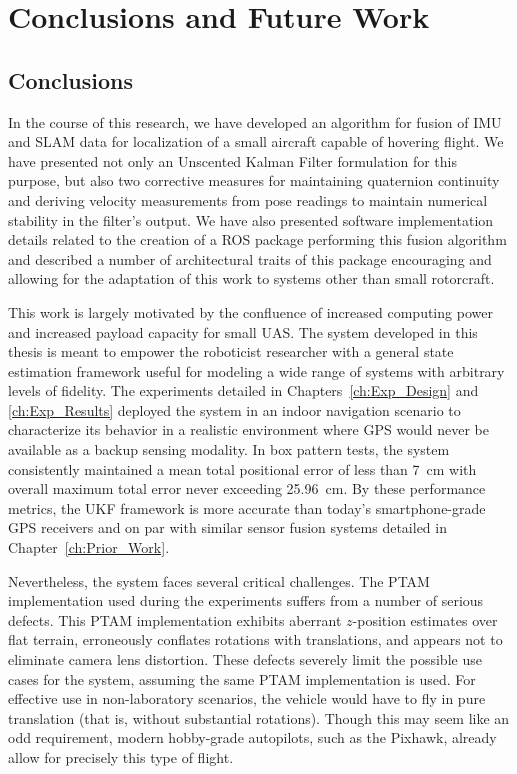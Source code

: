 \chapter{Conclusions and Future Work}

\section{Conclusions}

In the course of this research, we have developed an algorithm for fusion of IMU and SLAM data for localization of a small aircraft capable of hovering flight. We have presented not only an Unscented Kalman Filter formulation for this purpose, but also two corrective measures for maintaining quaternion continuity and deriving velocity measurements from pose readings to maintain numerical stability in the filter's output. We have also presented software implementation details related to the creation of a ROS package performing this fusion algorithm and described a number of architectural traits of this package encouraging and allowing for the adaptation of this work to systems other than small rotorcraft.

This work is largely motivated by the confluence of increased computing power and increased payload capacity for small UAS. The system developed in this thesis is meant to empower the roboticist researcher with a general state estimation framework useful for modeling a wide range of systems with arbitrary levels of fidelity. The experiments detailed in Chapters~\ref{ch:Exp_Design} and \ref{ch:Exp_Results} deployed the system in an indoor navigation scenario to characterize its behavior in a realistic environment where GPS would never be available as a backup sensing modality. In box pattern tests, the system consistently maintained a mean total positional error of less than 7~cm with overall maximum total error never exceeding 25.96~cm. By these performance metrics, the UKF framework is more accurate than today's smartphone-grade GPS receivers and on par with similar sensor fusion systems detailed in Chapter~\ref{ch:Prior_Work}.

Nevertheless, the system faces several critical challenges. The PTAM implementation used during the experiments suffers from a number of serious defects. This PTAM implementation exhibits aberrant $z$-position estimates over flat terrain, erroneously conflates rotations with translations, and appears not to eliminate camera lens distortion. These defects severely limit the possible use cases for the system, assuming the same PTAM implementation is used. For effective use in non-laboratory scenarios, the vehicle would have to fly in pure translation (that is, without substantial rotations). Though this may seem like an odd requirement, modern hobby-grade autopilots, such as the Pixhawk, already allow for precisely this type of flight.

